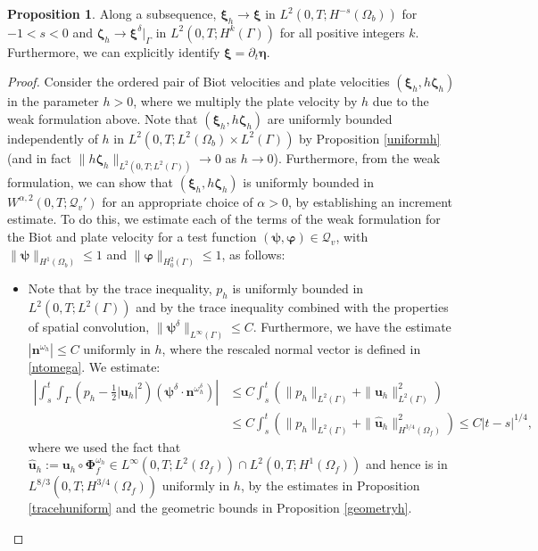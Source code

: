 \documentclass[11pt]{article}
\newcommand{\bd}{\boldsymbol}
\theoremstyle{definition}
\newtheorem{proposition}{Proposition}[section]
\begin{document}
\begin{proposition}\label{velhconv}
Along a subsequence, $\bd{\xi}_{h} \to \bd{\xi}$ in $L^{2}(0, T; H^{-s}(\Omega_{b}))$ for $-1 < s < 0$ and $\bd{\zeta}_{h} \to \bd{\xi}^{\delta}|_{\Gamma}$ in $L^{2}(0, T; H^{k}(\Gamma))$ for all positive integers $k$. Furthermore, we can explicitly identify $\bd{\xi} = \partial_{t}\bd{\eta}$. 
\end{proposition}
\begin{proof}
Consider the ordered pair of Biot velocities and plate velocities $(\bd{\xi}_{h}, h\bd{\zeta}_{h})$ in the parameter $h > 0$, where we multiply the plate velocity by $h$ due to the weak formulation above. Note that $(\bd{\xi}_{h}, h\bd{\zeta}_{h})$ are uniformly bounded independently of $h$ in $L^{2}(0, T; L^{2}(\Omega_{b}) \times L^{2}(\Gamma))$ by Proposition \ref{uniformh} (and in fact $\|h\bd{\zeta}_{h}\|_{L^{2}(0, T; L^{2}(\Gamma))} \to 0$ as $h \to 0$). Furthermore, from the weak formulation, we can show that $(\bd{\xi}_{h}, h\bd{\zeta}_{h})$ is uniformly bounded in $W^{\alpha, 2}(0, T; \mathcal{Q}_{v}')$ for an appropriate choice of $\alpha > 0$, by establishing an increment estimate. To do this, we estimate each of the terms of the weak formulation for the Biot and plate velocity for a test function $(\bd{\psi}, \bd{\varphi}) \in \mathcal{Q}_{v}$, with $\|\bd{\psi}\|_{H^{1}(\Omega_{b})} \le 1$ and $\|\bd{\varphi}\|_{H^{2}_{0}(\Gamma)} \le 1$, as follows:
\begin{itemize}
\item Note that by the trace inequality, $p_{h}$ is uniformly bounded in $L^{2}(0, T; L^{2}(\Gamma))$ and by the trace inequality combined with the properties of spatial convolution, $\|\bd{\psi}^{\delta}\|_{L^{\infty}(\Gamma)} \le C$. Furthermore, we have the estimate $|\bd{n}^{\omega_{h}}| \le C$ uniformly in $h$, where the rescaled normal vector is defined in \eqref{ntomega}. We estimate:
\begin{align}\label{inc14}
\left|\int_{s}^{t} \int_{\Gamma} \left(p_{h} - \frac{1}{2}|\bd{u}_{h}|^{2}\right) (\bd{\psi}^{\delta} \cdot \bd{n}^{\omega^{\delta}_{h}})\right| &\le C \int_{s}^{t}\left(\|p_{h}\|_{L^{2}(\Gamma)} + \|\bd{u}_{h}\|_{L^{2}(\Gamma)}^{2}\right) \nonumber \\
&\le C \int_{s}^{t} \left(\|p_{h}\|_{L^{2}(\Gamma)} + \|\hat{\bd{u}}_{h}\|^{2}_{H^{3/4}(\Omega_{f})}\right) \le C|t - s|^{1/4},
\end{align}
where we used the fact that $\hat{\bd{u}}_{h} := \bd{u}_{h} \circ \bd{\Phi}^{\omega_{h}}_{f} \in L^{\infty}(0, T; L^{2}(\Omega_{f})) \cap L^{2}(0, T; H^{1}(\Omega_{f}))$ and hence is in $L^{8/3}(0, T; H^{3/4}(\Omega_{f}))$ uniformly in $h$, by the estimates in Proposition \ref{tracehuniform} and the geometric bounds in Proposition \ref{geometryh}.

\end{itemize}
\end{proof}
\end{document}

